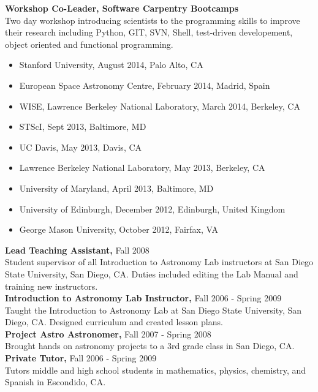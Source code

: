 \documentclass{res}
\begin{document}
\begin{resume}
   {\bf  Workshop Co-Leader, Software Carpentry Bootcamps } \\
         Two day workshop introducing scientists to the programming skills to improve their research including Python, GIT, SVN, Shell, test-driven developement, object oriented and functional programming. \\
        \begin{itemize}
        \item[] Stanford University, August 2014, Palo Alto, CA
        \item[] European Space Astronomy Centre, February 2014, Madrid, Spain
        \item[] WISE, Lawrence Berkeley National Laboratory, March 2014, Berkeley, CA
        \item[] STScI, Sept 2013, Baltimore, MD
        \item[] UC Davis, May 2013, Davis, CA
        \item[] Lawrence Berkeley National Laboratory, May 2013, Berkeley, CA
        \item[] University of Maryland, April 2013, Baltimore, MD
        \item[] University of Edinburgh, December 2012, Edinburgh, United Kingdom
        \item[] George Mason University, October 2012, Fairfax, VA
        \end{itemize} 
        
        
    {\bf  Lead Teaching Assistant,} Fall 2008  \\
         Student supervisor of all Introduction to Astronomy Lab instructors at San Diego State University, 
         San Diego, CA. Duties included editing the Lab Manual and training new instructors. \\
		 
   {\bf  Introduction to Astronomy Lab Instructor,} Fall 2006 - Spring 2009  \\
         Taught the Introduction to Astronomy Lab at San Diego State University, San Diego, CA. 
         Designed curriculum and created lesson plans. \\
         
   {\bf Project Astro Astronomer, } Fall 2007 - Spring 2008 \\
   		Brought hands on astronomy projects to a 3rd grade class in San Diego, CA. \\

   {\bf Private Tutor, } Fall 2006 - Spring 2009 \\
   		Tutors middle and high school students in mathematics, physics, chemistry, and Spanish in Escondido, CA. \\
   		

\end{resume}
\end{document}
